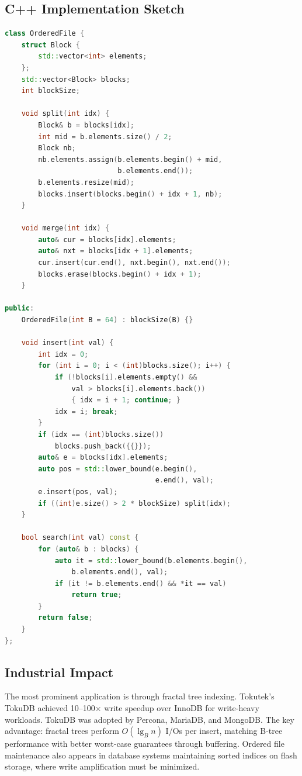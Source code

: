 \subsection{C++ Implementation Sketch}

\begin{lstlisting}[language=C++]
class OrderedFile {
    struct Block {
        std::vector<int> elements;
    };
    std::vector<Block> blocks;
    int blockSize;

    void split(int idx) {
        Block& b = blocks[idx];
        int mid = b.elements.size() / 2;
        Block nb;
        nb.elements.assign(b.elements.begin() + mid,
                           b.elements.end());
        b.elements.resize(mid);
        blocks.insert(blocks.begin() + idx + 1, nb);
    }

    void merge(int idx) {
        auto& cur = blocks[idx].elements;
        auto& nxt = blocks[idx + 1].elements;
        cur.insert(cur.end(), nxt.begin(), nxt.end());
        blocks.erase(blocks.begin() + idx + 1);
    }

public:
    OrderedFile(int B = 64) : blockSize(B) {}

    void insert(int val) {
        int idx = 0;
        for (int i = 0; i < (int)blocks.size(); i++) {
            if (!blocks[i].elements.empty() &&
                val > blocks[i].elements.back())
                { idx = i + 1; continue; }
            idx = i; break;
        }
        if (idx == (int)blocks.size())
            blocks.push_back({{}});
        auto& e = blocks[idx].elements;
        auto pos = std::lower_bound(e.begin(),
                                    e.end(), val);
        e.insert(pos, val);
        if ((int)e.size() > 2 * blockSize) split(idx);
    }

    bool search(int val) const {
        for (auto& b : blocks) {
            auto it = std::lower_bound(b.elements.begin(),
                b.elements.end(), val);
            if (it != b.elements.end() && *it == val)
                return true;
        }
        return false;
    }
};
\end{lstlisting}

\subsection{Industrial Impact}

The most prominent application is through fractal tree indexing. Tokutek's TokuDB achieved 10--100$\times$ write speedup over InnoDB for write-heavy workloads. TokuDB was adopted by Percona, MariaDB, and MongoDB. The key advantage: fractal trees perform $O(\lg_B n)$ I/Os per insert, matching B-tree performance with better worst-case guarantees through buffering. Ordered file maintenance also appears in database systems maintaining sorted indices on flash storage, where write amplification must be minimized.


